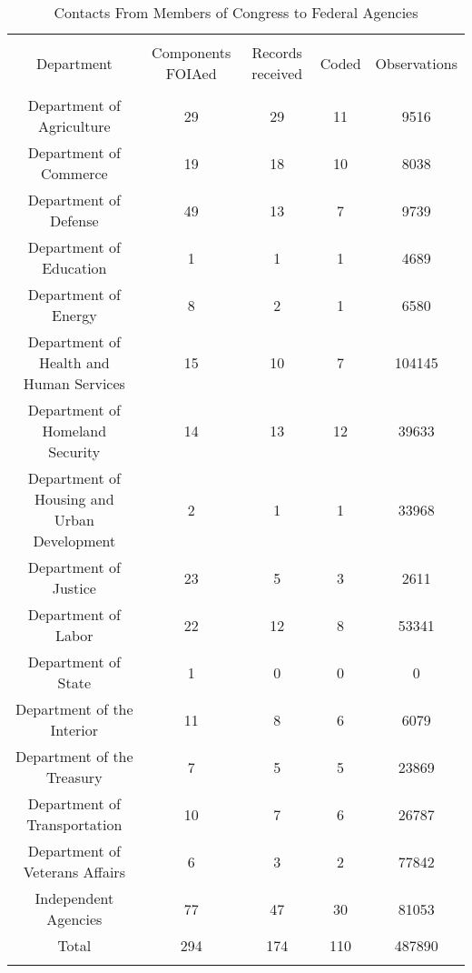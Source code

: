 
\begin{table}[!htbp] \centering 
  \caption{Contacts From Members of Congress to Federal Agencies} 
  \label{responserates} 
\begin{tabular}{@{\extracolsep{5pt}} ccccc} 
\\[-1.8ex]\hline \\[-1.8ex] 
Department & Components FOIAed & Records received & Coded & Observations \\ 
\hline \\[-1.8ex] 
Department of Agriculture & 29 & 29 & 11 & 9516 \\ 
Department of Commerce & 19 & 18 & 10 & 8038 \\ 
Department of Defense & 49 & 13 & 7 & 9739 \\ 
Department of Education & 1 & 1 & 1 & 4689 \\ 
Department of Energy & 8 & 2 & 1 & 6580 \\ 
Department of Health and Human Services & 15 & 10 & 7 & 104145 \\ 
Department of Homeland Security & 14 & 13 & 12 & 39633 \\ 
Department of Housing and Urban Development & 2 & 1 & 1 & 33968 \\ 
Department of Justice & 23 & 5 & 3 & 2611 \\ 
Department of Labor & 22 & 12 & 8 & 53341 \\ 
Department of State & 1 & 0 & 0 & 0 \\ 
Department of the Interior & 11 & 8 & 6 & 6079 \\ 
Department of the Treasury & 7 & 5 & 5 & 23869 \\ 
Department of Transportation & 10 & 7 & 6 & 26787 \\ 
Department of Veterans Affairs & 6 & 3 & 2 & 77842 \\ 
Independent Agencies & 77 & 47 & 30 & 81053 \\ 
Total & 294 & 174 & 110 & 487890 \\ 
\hline \\[-1.8ex] 
\end{tabular} 
\end{table} 
